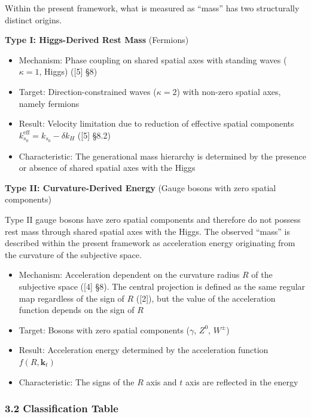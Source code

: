 \documentclass[
  a4paper,11pt]{article}
\providecommand{\tightlist}{%
  \setlength{\itemsep}{0pt}\setlength{\parskip}{0pt}}
\theoremstyle{definition}
\theoremstyle{remark}
\begin{document}
Within the present framework, what is measured as ``mass'' has two
structurally distinct origins.

\textbf{Type I: Higgs-Derived Rest Mass} (Fermions)

\begin{itemize}
\tightlist
\item
  Mechanism: Phase coupling on shared spatial axes with standing waves
  (\(\kappa = 1\), Higgs) ({[}5{]} §8)
\item
  Target: Direction-constrained waves (\(\kappa = 2\)) with non-zero
  spatial axes, namely fermions
\item
  Result: Velocity limitation due to reduction of effective spatial
  components \(k_{s_0}^{\text{eff}} = k_{s_0} - \delta k_H\) ({[}5{]}
  §8.2)
\item
  Characteristic: The generational mass hierarchy is determined by the
  presence or absence of shared spatial axes with the Higgs
\end{itemize}

\textbf{Type II: Curvature-Derived Energy} (Gauge bosons with zero
spatial components)

Type II gauge bosons have zero spatial components and therefore do not
possess rest mass through shared spatial axes with the Higgs. The
observed ``mass'' is described within the present framework as
acceleration energy originating from the curvature of the subjective
space.

\begin{itemize}
\tightlist
\item
  Mechanism: Acceleration dependent on the curvature radius \(R\) of the
  subjective space ({[}4{]} §8). The central projection is defined as
  the same regular map regardless of the sign of \(R\) ({[}2{]}), but
  the value of the acceleration function depends on the sign of \(R\)
\item
  Target: Bosons with zero spatial components (\(\gamma\), \(Z^0\),
  \(W^{\pm}\))
\item
  Result: Acceleration energy determined by the acceleration function
  \(f(R, \mathbf{k}_t)\)
\item
  Characteristic: The signs of the \(R\) axis and \(t\) axis are
  reflected in the energy
\end{itemize}

\subsubsection{3.2 Classification Table}\label{classification-table}
\end{document}
